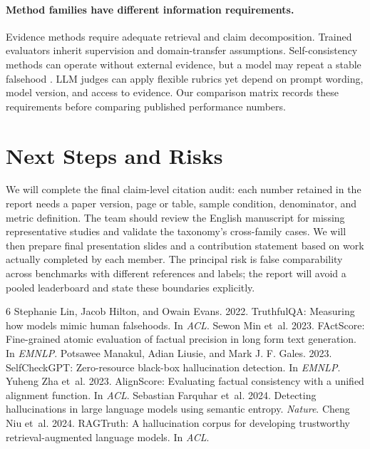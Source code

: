 \documentclass[11pt]{article}
\begin{document}
\paragraph{Method families have different information requirements.} Evidence methods require adequate retrieval and claim decomposition. Trained evaluators inherit supervision and domain-transfer assumptions. Self-consistency methods can operate without external evidence, but a model may repeat a stable falsehood \citep{C08,C10}. LLM judges can apply flexible rubrics yet depend on prompt wording, model version, and access to evidence. Our comparison matrix records these requirements before comparing published performance numbers.

\section{Next Steps and Risks}
We will complete the final claim-level citation audit: each number retained in the report needs a paper version, page or table, sample condition, denominator, and metric definition. The team should review the English manuscript for missing representative studies and validate the taxonomy's cross-family cases. We will then prepare final presentation slides and a contribution statement based on work actually completed by each member. The principal risk is false comparability across benchmarks with different references and labels; the report will avoid a pooled leaderboard and state these boundaries explicitly.

\begin{thebibliography}{6}
 Stephanie Lin, Jacob Hilton, and Owain Evans. 2022. TruthfulQA: Measuring how models mimic human falsehoods. In \emph{ACL}.
 Sewon Min et~al. 2023. FActScore: Fine-grained atomic evaluation of factual precision in long form text generation. In \emph{EMNLP}.
 Potsawee Manakul, Adian Liusie, and Mark J. F. Gales. 2023. SelfCheckGPT: Zero-resource black-box hallucination detection. In \emph{EMNLP}.
 Yuheng Zha et~al. 2023. AlignScore: Evaluating factual consistency with a unified alignment function. In \emph{ACL}.
 Sebastian Farquhar et~al. 2024. Detecting hallucinations in large language models using semantic entropy. \emph{Nature}.
 Cheng Niu et~al. 2024. RAGTruth: A hallucination corpus for developing trustworthy retrieval-augmented language models. In \emph{ACL}.
\end{thebibliography}
\end{document}

